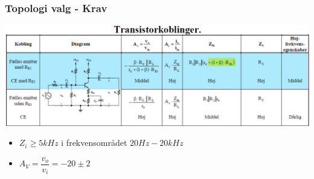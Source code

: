 \documentclass{beamer}
\begin{document}
\begin{frame}
	\frametitle{Topologi valg - Krav}
	\begin{center}
		\includegraphics[width=1\linewidth]{images/trans_topo2.png}
	\end{center}
	\begin{itemize}
		\item $Z_i \geq  5 kHz$ i frekvensområdet $20 Hz - 20 kHz$
		\item $A_V = \dfrac{v_o}{v_i} = -20 \pm 2$
	\end{itemize}
\end{frame}
\end{document}
